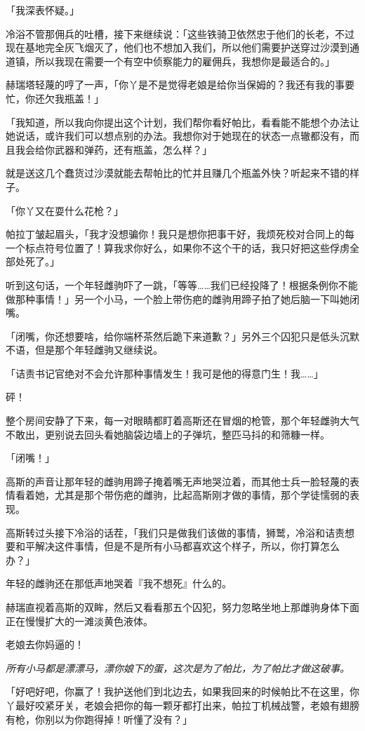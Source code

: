 「我深表怀疑。」

冷浴不管那佣兵的吐槽，接下来继续说：「这些铁骑卫依然忠于他们的长老，不过现在基地完全灰飞烟灭了，他们也不想加入我们，所以他们需要护送穿过沙漠到通道镇，所以我现在需要一个有空中侦察能力的雇佣兵，我想你是最适合的。」

赫瑞塔轻蔑的哼了一声，「你丫是不是觉得老娘是给你当保姆的？我还有我的事要忙，你还欠我瓶盖！」

「我知道，所以我向你提出这个计划，我们帮你看好帕比，看看能不能想个办法让她说话，或许我们可以想点别的办法。我想你对于她现在的状态一点辙都没有，而且我会给你武器和弹药，还有瓶盖，怎么样？」

就是送这几个蠢货过沙漠就能去帮帕比的忙并且赚几个瓶盖外快？听起来不错的样子。

「你丫又在耍什么花枪？」

帕拉丁皱起眉头，「我才没想骗你！我只是想你把事干好，我烦死校对合同上的每一个标点符号位置了！算我求你好么，如果你不这个干的话，我只好把这些俘虏全部处死了。」

听到这句话，一个年轻雌驹吓了一跳，「等等……我们已经投降了！根据条例你不能做那种事情！」另一个小马，一个脸上带伤疤的雌驹用蹄子拍了她后脑一下叫她闭嘴。

「闭嘴，你还想要啥，给你端杯茶然后跪下来道歉？」另外三个囚犯只是低头沉默不语，但是那个年轻雌驹又继续说。

「诘责书记官绝对不会允许那种事情发生！我可是他的得意门生！我……」

砰！

整个房间安静了下来，每一对眼睛都盯着高斯还在冒烟的枪管，那个年轻雌驹大气不敢出，更别说去回头看她脑袋边墙上的子弹坑，整匹马抖的和筛糠一样。

「闭嘴！」

高斯的声音让那年轻的雌驹用蹄子掩着嘴无声地哭泣着，而其他士兵一脸轻蔑的表情看着她，尤其是那个带伤疤的雌驹，比起高斯刚才做的事情，那个学徒懦弱的表现。

高斯转过头接下冷浴的话茬，「我们只是做我们该做的事情，狮鹫，冷浴和诘责想要和平解决这件事情，但是不是所有小马都喜欢这个样子，所以，你打算怎么办？」

年轻的雌驹还在那低声地哭着『我不想死』什么的。

赫瑞直视着高斯的双眸，然后又看看那五个囚犯，努力忽略坐地上那雌驹身体下面正在慢慢扩大的一滩淡黄色液体。

老娘去你妈逼的！

\emph{所有小马都是漂漂马，漂你娘下的蛋，这次是为了帕比，为了帕比才做这破事。}

「好吧好吧，你赢了！我护送他们到北边去，如果我回来的时候帕比不在这里，你丫最好咬紧牙关，老娘会把你的每一颗牙都打出来，帕拉丁机械战警，老娘有翅膀有枪，你别以为你跑得掉！听懂了没有？」

